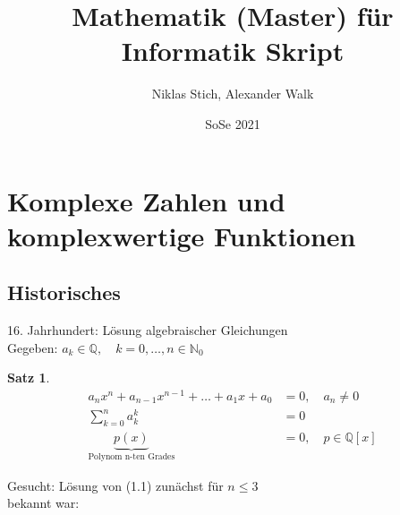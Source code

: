 \documentclass{article}
\title{Mathematik (Master) für Informatik Skript}
\date{SoSe 2021}
\author{Niklas Stich, Alexander Walk}
\newtheorem{theorem}{Satz}[section]
\begin{document}
\begin{titlepage}
\maketitle
\tableofcontents
\end{titlepage}


\section{Komplexe Zahlen und komplexwertige Funktionen}
\subsection{Historisches}
16. Jahrhundert: Lösung algebraischer Gleichungen\\
Gegeben: \(a_{k}\in\mathbb{Q},\quad k=0,\dots,n\in\mathbb{N}_{0}\)
\begin{theorem}
\begin{align}
    a_{n}x^{n}+a_{n-1}x^{n-1}+\dots+a_{1}x+a_{0} &= 0, \quad a_{n}\neq 0 \\
    \sum_{k=0}^{n}a_{k}^{k} &= 0 \\
    \underbrace{p(x)}_\text{Polynom n-ten Grades}&=0, \quad p \in \mathbb{Q}[x]
\end{align}
\end{theorem}
Gesucht: Lösung von (1.1) zunächst für $n \leq 3$\\
bekannt war:
\end{document}
